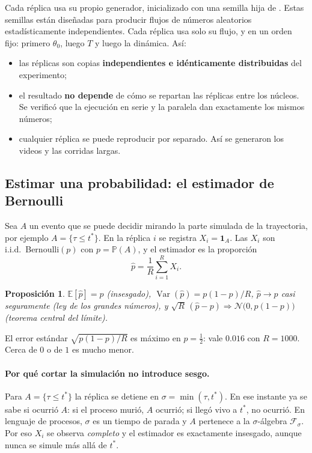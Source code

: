 \documentclass[11pt,a4paper]{article}
\theoremstyle{plain}
\newtheorem{proposicion}{Proposición}[section]
\theoremstyle{remark}
\newcommand{\fn}[1]{\texttt{\detokenize{#1}}}
\begin{document}
Cada réplica usa su propio generador, inicializado con una semilla hija de \fn{SeedSequence(master).spawn(R)}. Estas semillas están diseñadas para producir flujos de números aleatorios estadísticamente independientes. Cada réplica usa solo su flujo, y en un orden fijo: primero $\theta_0$, luego $T$ y luego la dinámica. Así:
\begin{itemize}[nosep]
  \item las réplicas son copias \textbf{independientes e idénticamente distribuidas} del experimento;
  \item el resultado \textbf{no depende} de cómo se repartan las réplicas entre los núcleos. Se verificó que la ejecución en serie y la paralela dan exactamente los mismos números;
  \item cualquier réplica se puede reproducir por separado. Así se generaron los videos y las corridas largas.
\end{itemize}

\subsection{Estimar una probabilidad: el estimador de Bernoulli}\label{sec:fund-bernoulli}

Sea $A$ un evento que se puede decidir mirando la parte simulada de la trayectoria, por ejemplo $A=\{\tau\le t^\ast\}$. En la réplica $i$ se registra $X_i=\mathbf 1_{A}$. Las $X_i$ son i.i.d.\ Bernoulli$(p)$ con $p=\mathbb{P}(A)$, y el estimador es la proporción
\[
\hat p=\frac1R\sum_{i=1}^RX_i .
\]

\begin{proposicion}
$\mathbb{E}[\hat p]=p$ (insesgado), $\operatorname{Var}(\hat p)=p(1-p)/R$, $\hat p\to p$ casi seguramente (ley de los grandes números), y $\sqrt R\,(\hat p-p)\Rightarrow\mathcal N\big(0,p(1-p)\big)$ (teorema central del límite).
\end{proposicion}

\noindent El error estándar $\sqrt{p(1-p)/R}$ es máximo en $p=\frac12$: vale $0.016$ con $R=1000$. Cerca de $0$ o de $1$ es mucho menor.

\paragraph{Por qué cortar la simulación no introduce sesgo.} Para $A=\{\tau\le t^\ast\}$ la réplica se detiene en $\sigma=\min(\tau,t^\ast)$. En ese instante ya se sabe si ocurrió $A$: si el proceso murió, $A$ ocurrió; si llegó vivo a $t^\ast$, no ocurrió. En lenguaje de procesos, $\sigma$ es un tiempo de parada y $A$ pertenece a la $\sigma$-álgebra $\mathcal F_\sigma$. Por eso $X_i$ se observa \emph{completo} y el estimador es exactamente insesgado, aunque nunca se simule más allá de $t^\ast$.
\end{document}
